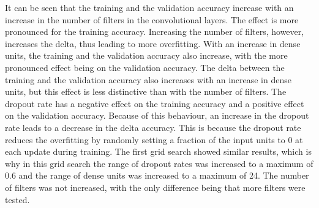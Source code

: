 It can be seen that the training and the validation accuracy increase with an increase in the number of filters in the convolutional layers.
The effect is more pronounced for the training accuracy.
Increasing the number of filters, however, increases the delta, thus leading to more overfitting.
With an increase in dense units, the training and the validation accuracy also increase, with the more pronounced effect being on the validation accuracy.
The delta between the training and the validation accuracy also increases with an increase in dense units, but this effect is less distinctive than with the number of filters.
The dropout rate has a negative effect on the training accuracy and a positive effect on the validation accuracy.
Because of this behaviour, an increase in the dropout rate leads to a decrease in the delta accuracy. %
This is because the dropout rate reduces the overfitting by randomly setting a fraction of the input units to 0 at each update during training.
The first grid search showed similar results, which is why in this grid search the range of dropout rates was increased to a maximum of 0.6 and the range of dense units was increased to a maximum of 24.
The number of filters was not increased, with the only difference being that more filters were tested. %

